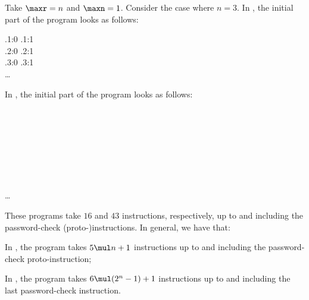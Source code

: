 \documentclass[fleqn]{llncs}
\begin{document}
\begin{example}
Take $\maxr = n$ and $\maxn = 1$.
Consider the case where $n = 3$.
In \PGLDdii, the initial part of the program looks as follows:
\begin{ldispl}
 \conc {} \conc
\rfdt.\setr{:}1{:}0 \conc {} \conc \rfdt.\setr{:}1{:}1 \conc {} \\
 \conc {} \conc
\rfdt.\setr{:}2{:}0 \conc {} \conc \rfdt.\setr{:}2{:}1 \conc {} \\
 \conc {} \conc
\rfdt.\setr{:}3{:}0 \conc {} \conc \rfdt.\setr{:}3{:}1 \conc {} \\
 \conc \ldots
\end{ldispl}In \PGLD, the initial part of the program looks as follows:
\begin{ldispl}
 \conc {} \conc {} \conc {} \\
 \conc {} \conc {} \conc
{} \conc {} \conc {} \conc {} \\
 \conc {} \conc {} \conc
{} \conc {} \conc {} \conc {} \\
 \conc {} \conc {} \conc
{} \conc {} \conc {} \conc {} \\
 \conc {} \conc {} \conc
{} \conc {} \conc {} \conc {} \\
 \conc {} \conc {} \conc
{} \conc {} \conc {} \conc {} \\
 \conc {} \conc {} \conc
{} \conc {} \conc {} \conc {} \\
 \conc {} \conc {} \conc
{} \conc \ldots
\end{ldispl}These programs take $16$ and $43$ instructions, respectively, up to and
including the password-check \mbox{(proto-)}instructions.
In general, we have that:
\begin{iteml}
\item
In \PGLDdii, the program takes $5 \mul n + 1$ instructions up to and
including the password-check proto-instruction;
\item
In \PGLD, the program takes $6 \mul (2^n - 1) + 1$ instructions up to
and including the last password-check instruction.
\end{iteml}
\end{example}
\end{document}
